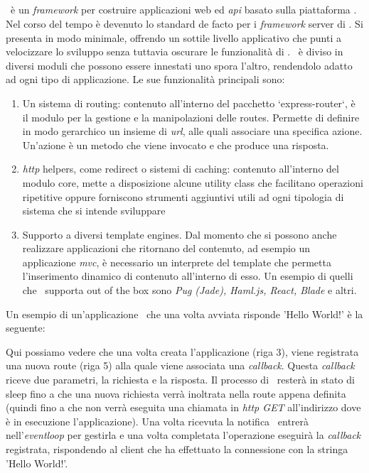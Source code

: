 \subsection{\expressjs}
\expressjs~è un \textit{\gls{framework}} per costruire applicazioni web ed \textit{\acrshort{api}} basato sulla piattaforma \nodejs. Nel corso del tempo è devenuto lo standard de facto per i \textit{\gls{framework}} server di \nodejs. 
Si presenta in modo minimale, offrendo un sottile livello applicativo che punti a velocizzare lo sviluppo senza tuttavia oscurare le funzionalità di \nodejs. \expressjs~è diviso in diversi moduli che possono essere innestati uno spora l'altro, rendendolo adatto ad ogni tipo di applicazione.  
Le sue funzionalità principali sono:
\begin{enumerate}[label=(\alph*)]
	\item Un sistema di routing: contenuto all'interno del pacchetto `express-router`, è il modulo per la gestione e la manipolazioni delle routes. Permette di definire in modo gerarchico un insieme di \textit{\acrshort{url}}, alle quali associare una specifica azione. Un'azione è un metodo che viene invocato e che produce una risposta.
	\item \textit{\acrshort{http}} helpers, come redirect o sistemi di caching: contenuto all'interno del modulo core, mette a disposizione alcune utility class che facilitano operazioni ripetitive oppure forniscono strumenti aggiuntivi utili ad ogni tipologia di sistema che si intende sviluppare
	\item Supporto a diversi template engines. Dal momento che si possono anche realizzare applicazioni che ritornano del contenuto, ad esempio un applicazione \textit{\gls{mvc}}, è necessario un interprete del template che permetta l'inserimento dinamico di contenuto all'interno di esso. Un esempio di quelli che \expressjs~supporta out of the box sono \textit{Pug (Jade), Haml.js, React, Blade} e altri.
\end{enumerate}

\noindent
Un esempio di un'applicazione \expressjs~che una volta avviata risponde 'Hello World!' è la seguente:

Qui possiamo vedere che una volta creata l'applicazione (riga 3), viene registrata una nuova route (riga 5) alla quale viene associata una \textit{\gls{callback}}. Questa \textit{\gls{callback}} riceve due parametri, la richiesta e la risposta. Il processo di \nodejs~resterà in stato di sleep fino a che una nuova richiesta verrà inoltrata nella route appena definita (quindi fino a che non verrà eseguita una chiamata in \textit{\acrshort{http} GET} all'indirizzo dove è in esecuzione l'applicazione). Una volta ricevuta la notifica \nodejs~entrerà nell'\textit{\gls{eventloop}} per gestirla e una volta completata l'operazione eseguirà la \textit{\gls{callback}} registrata, rispondendo al client che ha effettuato la connessione con la stringa 'Hello World!'.

